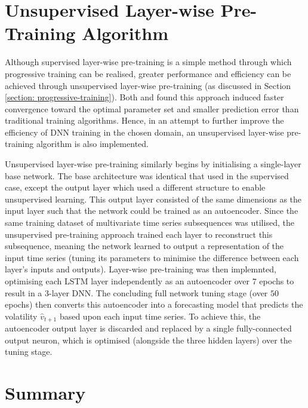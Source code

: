 \documentclass[a4paper, 11pt]{report}
\begin{document}
    \section{Unsupervised Layer-wise Pre-Training Algorithm}

    Although supervised layer-wise pre-training is a simple method through which progressive training can be realised, greater performance and efficiency can be achieved through unsupervised layer-wise pre-training (as discussed in Section \ref{section: progressive-training}). Both \citet{xu-2018} and \citet{sagheer-2019} found this approach induced faster convergence toward the optimal parameter set and smaller prediction error than traditional training algorithms. Hence, in an attempt to further improve the efficiency of DNN training in the chosen domain, an unsupervised layer-wise pre-training algorithm is also implemented.

    Unsupervised layer-wise pre-training similarly begins by initialising a single-layer base network. The base architecture was identical that used in the supervised case, except the output layer which used a different structure to enable unsupervised learning. This output layer consisted of the same dimensions as the input layer such that the network could be trained as an autoencoder. Since the same training dataset of multivariate time series subsequences was utilised, the unsupervised pre-training approach trained each layer to reconstruct this subsequence, meaning the network learned to output a representation of the input time series (tuning its parameters to minimise the difference between each layer's inputs and outputs). Layer-wise pre-training was then implemnted, optimising each LSTM layer independently as an autoencoder over $7$ epochs to result in a 3-layer DNN. The concluding full network tuning stage (over $50$ epochs) then converts this autoencoder into a forecasting model that predicts the volatility $\hat{v}_{t+1}$ based upon each input time series. To achieve this, the autoencoder output layer is discarded and replaced by a single fully-connected output neuron, which is optimised (alongside the three hidden layers) over the tuning stage.


    \section{Summary}
\end{document}
